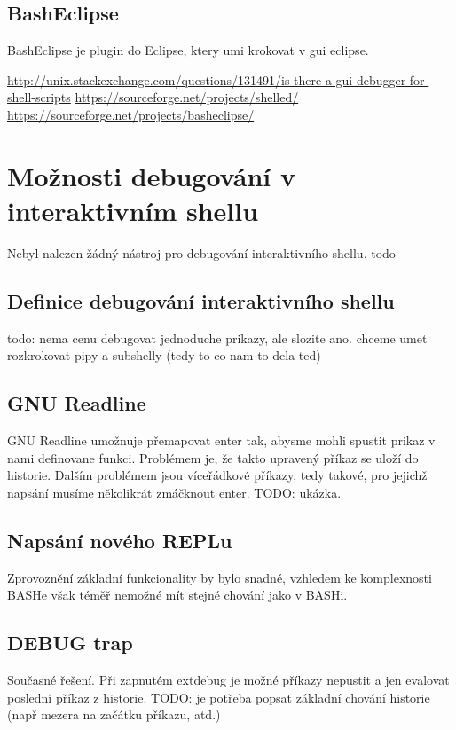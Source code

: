 \documentclass[thesis=M,czech]{FITthesis}[2012/06/26]
\begin{document}
\subsection{BashEclipse}
BashEclipse je plugin do Eclipse, ktery umi krokovat v gui eclipse.

\url{http://unix.stackexchange.com/questions/131491/is-there-a-gui-debugger-for-shell-scripts}
\url{https://sourceforge.net/projects/shelled/}
\url{https://sourceforge.net/projects/basheclipse/}

%
%
%
%
%
\section{Možnosti debugování v interaktivním shellu}

Nebyl nalezen žádný nástroj pro debugování interaktivního shellu. todo

\subsection{Definice debugování interaktivního shellu}
todo: nema cenu debugovat jednoduche prikazy, ale slozite ano. chceme umet rozkrokovat pipy a subshelly (tedy to co nam to dela ted)



\subsection{GNU Readline}
GNU Readline umožnuje přemapovat enter tak, abysme mohli spustit prikaz v nami definovane funkci. Problémem je, že takto upravený příkaz se uloží do historie. Dalším problémem jsou víceřádkové příkazy, tedy takové, pro jejichž napsání musíme několikrát zmáčknout enter.
TODO: ukázka.

\subsection{Napsání nového REPLu}
Zprovoznění základní funkcionality by bylo snadné, vzhledem ke komplexnosti BASHe však téměř nemožné mít stejné chování jako v BASHi.

\subsection{DEBUG trap}
Současné řešení. Při zapnutém extdebug je možné příkazy nepustit a jen evalovat poslední příkaz z historie. TODO: je potřeba popsat základní chování historie (např mezera na začátku příkazu, atd.)
\end{document}

